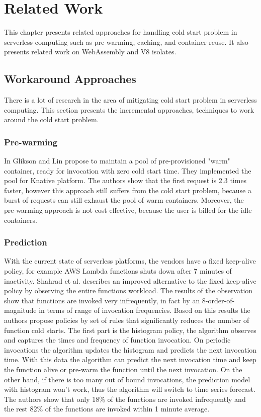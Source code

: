 \chapter{Related Work}
\label{chap:related-work}

This chapter presents related approaches for handling cold start problem in serverless computing such as pre-warming, caching, and container reuse. It also presents related work on WebAssembly and V8 isolates.

\section{Workaround Approaches}
\label{sec:workaround-approaches}

There is a lot of research in the area of mitigating cold start problem in serverless computing. This section presents the incremental approaches, techniques to work around the cold start problem.

\subsection{Pre-warming}
\label{subsec:pre-warming}

In \cite{lin2019mitigating} Glikson and Lin propose to maintain a pool of pre-provisioned "warm" container, ready for invocation with zero cold start time. They implemented the pool for \gls{Knative} platform. The authors show that the first request is 2.3 times faster, however this approach still suffers from the cold start problem, because a burst of requests can still exhaust the pool of warm containers. Moreover, the pre-warming approach is not cost effective, because the user is billed for the idle containers. 

\subsection{Prediction}
\label{subsec:prediction}

With the current state of serverless platforms, the vendors have a fixed keep-alive policy, for example AWS Lambda functions shuts down after 7 minutes of inactivity. Shahrad et al. describes an improved alternative to the fixed keep-alive policy \cite{254430} by observing the entire functions workload. The results of the observation show that functions are invoked very infrequently, in fact by an 8-order-of-magnitude in terms of range of invocation frequencies. Based on this results the authors propose policies by set of rules that significantly reduces the number of function cold starts. The first part is the histogram policy, the algorithm observes and captures the times and frequency of function invocation. On periodic invocations the algorithm updates the histogram and predicts the next invocation time. With this data the algorithm can predict the next invocation time and keep the function alive or pre-warm the function until the next invocation.
On the other hand, if there is too many out of bound invocations, the prediction model with histogram won't work, thus the algorithm will switch to time series forecast. The authors show that only 18\% of the functions are invoked infrequently and the rest 82\% of the functions are invoked within 1 minute average.

